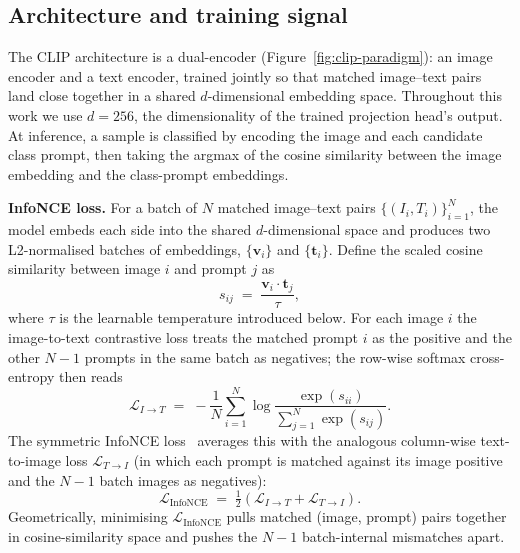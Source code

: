 \subsection{Architecture and training signal}

The CLIP architecture is a dual-encoder (Figure~\ref{fig:clip-paradigm}): an image encoder and a text encoder, trained jointly so that matched image--text pairs land close together in a shared $d$-dimensional embedding space. Throughout this work we use $d = 256$, the dimensionality of the trained projection head's output. At inference, a sample is classified by encoding the image and each candidate class prompt, then taking the argmax of the cosine similarity between the image embedding and the class-prompt embeddings.

\noindent\textbf{InfoNCE loss.} For a batch of $N$ matched image--text pairs $\{(I_i, T_i)\}_{i=1}^{N}$, the model embeds each side into the shared $d$-dimensional space and produces two L2-normalised batches of embeddings, $\{\mathbf{v}_i\}$ and $\{\mathbf{t}_i\}$. Define the scaled cosine similarity between image $i$ and prompt $j$ as
\begin{equation}
s_{ij} \;=\; \frac{\mathbf{v}_i \cdot \mathbf{t}_j}{\tau},
\label{eq:scaled-cosine}
\end{equation}
where $\tau$ is the learnable temperature introduced below. For each image $i$ the image-to-text contrastive loss treats the matched prompt $i$ as the positive and the other $N{-}1$ prompts in the same batch as negatives; the row-wise softmax cross-entropy then reads
\begin{equation}
\mathcal{L}_{I \to T} \;=\; -\frac{1}{N} \sum_{i=1}^{N} \log \frac{\exp(s_{ii})}{\sum_{j=1}^{N} \exp(s_{ij})}.
\label{eq:infonce-i2t}
\end{equation}
The symmetric InfoNCE loss~\cite{oord2018cpc,radford2021clip} averages this with the analogous column-wise text-to-image loss $\mathcal{L}_{T \to I}$ (in which each prompt is matched against its image positive and the $N{-}1$ batch images as negatives):
\begin{equation}
\mathcal{L}_{\text{InfoNCE}} \;=\; \tfrac{1}{2} \left( \mathcal{L}_{I \to T} + \mathcal{L}_{T \to I} \right).
\label{eq:infonce-sym}
\end{equation}
Geometrically, minimising $\mathcal{L}_{\text{InfoNCE}}$ pulls matched (image, prompt) pairs together in cosine-similarity space and pushes the $N{-}1$ batch-internal mismatches apart.

